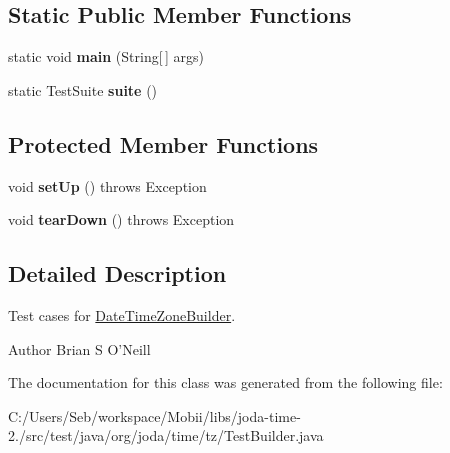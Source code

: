 \subsection*{Static Public Member Functions}
\begin{DoxyCompactItemize}
\item 
\hypertarget{classorg_1_1joda_1_1time_1_1tz_1_1_test_builder_a5bb793d6238ffc8a974127370413c597}{static void {\bfseries main} (String\mbox{[}$\,$\mbox{]} args)}\label{classorg_1_1joda_1_1time_1_1tz_1_1_test_builder_a5bb793d6238ffc8a974127370413c597}

\item 
\hypertarget{classorg_1_1joda_1_1time_1_1tz_1_1_test_builder_a6716aa786cc4308a6ad003a765480d25}{static Test\-Suite {\bfseries suite} ()}\label{classorg_1_1joda_1_1time_1_1tz_1_1_test_builder_a6716aa786cc4308a6ad003a765480d25}

\end{DoxyCompactItemize}
\subsection*{Protected Member Functions}
\begin{DoxyCompactItemize}
\item 
\hypertarget{classorg_1_1joda_1_1time_1_1tz_1_1_test_builder_a02e1f0bc431de1b4b5cc7923905ba27c}{void {\bfseries set\-Up} ()  throws Exception }\label{classorg_1_1joda_1_1time_1_1tz_1_1_test_builder_a02e1f0bc431de1b4b5cc7923905ba27c}

\item 
\hypertarget{classorg_1_1joda_1_1time_1_1tz_1_1_test_builder_a863319b50bc2fc6be984b6da4aadc674}{void {\bfseries tear\-Down} ()  throws Exception }\label{classorg_1_1joda_1_1time_1_1tz_1_1_test_builder_a863319b50bc2fc6be984b6da4aadc674}

\end{DoxyCompactItemize}


\subsection{Detailed Description}
Test cases for \hyperlink{classorg_1_1joda_1_1time_1_1tz_1_1_date_time_zone_builder}{Date\-Time\-Zone\-Builder}.

\begin{DoxyAuthor}{Author}
Brian S O'Neill 
\end{DoxyAuthor}


The documentation for this class was generated from the following file\-:\begin{DoxyCompactItemize}
\item 
C\-:/\-Users/\-Seb/workspace/\-Mobii/libs/joda-\/time-\/2./src/test/java/org/joda/time/tz/Test\-Builder.\-java\end{DoxyCompactItemize}
